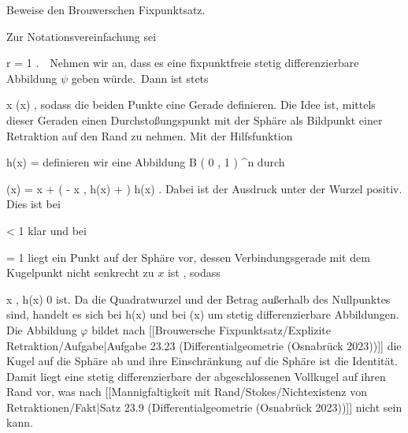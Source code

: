{

Beweise den Brouwerschen Fixpunktsatz.

}
{

Zur Notationsvereinfachung sei

\mavergleichskette
{\vergleichskette
{ r
}
{ = }{ 1
}
{  }{
}
{    }{
}
{   }{
}
}
{}{}{.}  Nehmen wir an, dass es eine fixpunktfreie stetig differenzierbare Abbildung $\psi$ geben würde. Dann ist stets

\mavergleichskettedisp
{\vergleichskette
{ x
}
{ \neq} { \psi(x)
}
{ } {
}
{ } {
}
{ } {
}
}
{}{}{,}
sodass die beiden Punkte eine Gerade definieren. Die Idee ist, mittels dieser Geraden einen
 {} {}
Durchstoßungspunkt mit der Sphäre als Bildpunkt einer Retraktion auf den Rand zu nehmen. Mit der Hilfsfunktion

\mavergleichskettedisp
{\vergleichskette
{ h(x)
}
{ =} { {  }
}
{ } {
}
{ } {
}
{ } {
}
}
{}{}{}
definieren wir eine Abbildung
\maabbdisp {\varphi} { B  \left(  0 , 1 \right) } { \R^n
} {}
durch

\mavergleichskettedisphandlinks
{\vergleichskettedisphandlinks
{ \varphi(x)
}
{ =} { x + \left(  - \left\langle  x  , h(x)  \right\rangle +   \right) \cdot h(x)
}
{ } {
}
{ } {
}
{ } {
}
}
{}{}{.}
Dabei ist der Ausdruck unter der Wurzel positiv. Dies ist bei

\mavergleichskette
{\vergleichskette
{  \Vert
}
{ < }{ 1
}
{  }{
}
{    }{
}
{   }{
}
}
{}{}{}
klar und bei

\mavergleichskette
{\vergleichskette
{  \Vert
}
{ = }{ 1
}
{  }{
}
{    }{
}
{   }{
}
}
{}{}{}
liegt ein Punkt auf der Sphäre vor, dessen Verbindungsgerade mit dem Kugelpunkt
 nicht senkrecht zu $x$ ist
 {} {,}
sodass

\mavergleichskettedisp
{\vergleichskette
{ \left\langle  x  , h(x)  \right\rangle
}
{ \neq} { 0
}
{ } {
}
{ } {
}
{ } {
}
}
{}{}{}
ist. Da die Quadratwurzel und der Betrag außerhalb des Nullpunktes
sind, handelt es sich bei
\mathkor {} {h(x)} {und bei} {\varphi(x)} {}
um stetig differenzierbare Abbildungen. Die Abbildung $\varphi$ bildet nach
[[Brouwersche Fixpunktsatz/Explizite Retraktion/Aufgabe|Aufgabe 23.23 (Differentialgeometrie (Osnabrück 2023))]]
die Kugel auf die Sphäre ab und ihre Einschränkung auf die Sphäre ist die Identität. Damit liegt eine stetig differenzierbare
der abgeschlossenen Vollkugel auf ihren Rand vor, was nach
[[Mannigfaltigkeit mit Rand/Stokes/Nichtexistenz von Retraktionen/Fakt|Satz 23.9 (Differentialgeometrie (Osnabrück 2023))]]
nicht sein kann.

 }

